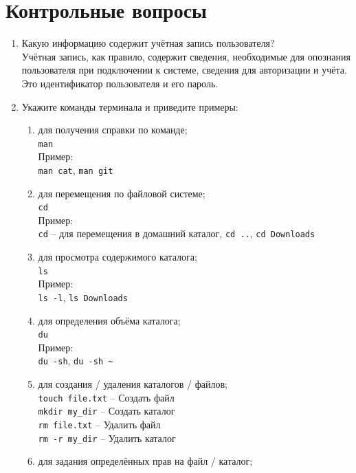 \documentclass[12pt]{article}
\begin{document}
  \section{Контрольные вопросы}
    \begin{enumerate}
      \item Какую информацию содержит учётная запись пользователя?
        \\Учётная запись, как правило, содержит сведения, необходимые для опознания пользователя при подключении к системе, сведения для авторизации и учёта. Это идентификатор пользователя и его пароль.
      \item Укажите команды терминала и приведите примеры:
        \begin{enumerate}
          \item для получения справки по команде;
            \\\texttt{man}
            \\Пример:
            \\\texttt{man cat}, \texttt{man git}
          \item для перемещения по файловой системе;
            \\\texttt{cd}
            \\Пример:
            \\\texttt{cd} -- для перемещения в домашний каталог, \texttt{cd ..}, \texttt{cd Downloads}
          \item для просмотра содержимого каталога;
            \\\texttt{ls}
            \\Пример:
            \\\texttt{ls -l}, \texttt{ls Downloads}
          \item для определения объёма каталога;
            \\\texttt{du}
            \\Пример:
            \\\texttt{du -sh}, \texttt{du -sh \~}
          \item для создания / удаления каталогов / файлов;
            \\\texttt{touch file.txt} -- Создать файл
            \\\texttt{mkdir my\_dir} -- Создать каталог
            \\\texttt{rm file.txt} -- Удалить файл
            \\\texttt{rm -r my\_dir} -- Удалить каталог 
          \item для задания определённых прав на файл / каталог;

\end{enumerate}
\end{enumerate}
\end{document}
